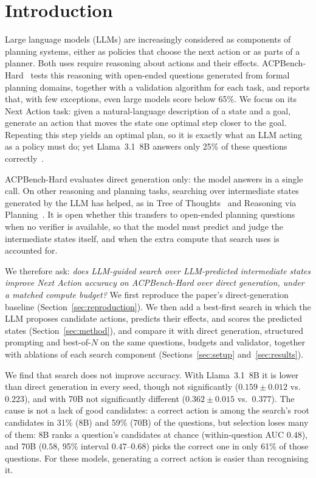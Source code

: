 \section{Introduction}
\label{sec:intro}

Large language models (LLMs) are increasingly considered as components of planning systems, either
as policies that choose the next action or as parts of a planner. Both uses require reasoning about
actions and their effects. ACPBench-Hard~\citep{kokel2025acpbenchhard} tests this reasoning with
open-ended questions generated from formal planning domains, together with a validation algorithm
for each task, and reports that, with few exceptions, even large models score below 65\%. We focus
on its Next Action task: given a natural-language description of a state and a goal, generate an
action that moves the state one optimal step closer to the goal. Repeating this step yields an
optimal plan, so it is exactly what an LLM acting as a policy must do; yet Llama~3.1~8B answers
only 25\% of these questions correctly~\citep{kokel2025acpbenchhard}.

ACPBench-Hard evaluates direct generation only: the model answers in a single call. On other
reasoning and planning tasks, searching over intermediate states generated by the LLM has helped,
as in Tree of Thoughts~\citep{yao2023tot} and Reasoning via Planning~\citep{hao2023rap}. It is open
whether this transfers to open-ended planning questions when no verifier is available, so that the
model must predict and judge the intermediate states itself, and when the extra compute that search
uses is accounted for.

We therefore ask: \emph{does LLM-guided search over LLM-predicted intermediate states improve Next
Action accuracy on ACPBench-Hard over direct generation, under a matched compute budget?} We first
reproduce the paper's direct-generation baseline (Section~\ref{sec:reproduction}). We then add a
best-first search in which the LLM proposes candidate actions, predicts their effects, and scores the
predicted states (Section~\ref{sec:method}), and compare it with direct generation, structured
prompting and best-of-$N$ on the same questions, budgets and validator, together with ablations of
each search component (Sections~\ref{sec:setup} and~\ref{sec:results}).

We find that search does not improve accuracy. With Llama~3.1~8B it is lower than direct generation in every seed, though not significantly ($0.159 \pm 0.012$ vs.\ $0.223$), and with 70B not significantly different
($0.362 \pm 0.015$ vs.\ $0.377$). The cause is not a lack of good candidates: a correct action is
among the search's root candidates in 31\% (8B) and 59\% (70B) of the questions, but selection loses many of them: 8B ranks a question's candidates at chance (within-question AUC $0.48$), and 70B ($0.58$, 95\% interval $0.47$--$0.68$) picks the correct one in only 61\% of those questions.
For these models, generating a correct action is easier than recognising it.

